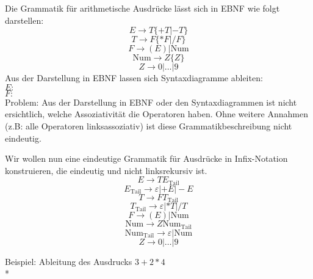 \documentclass[a4paper]{scrartcl}
\begin{document}
Die Grammatik für arithmetische Ausdrücke lässt sich in EBNF wie folgt darstellen:
\[E \rightarrow T \{ + T | -T\}\]
\[T \rightarrow F \{*F |  /F\} \]
\[F \rightarrow (E) | \text{Num} \]
\[\text{Num} \rightarrow Z \{Z\} \]
\[Z \rightarrow 0| \dots |9\]
Aus der Darstellung in EBNF lassen sich Syntaxdiagramme ableiten:\\
$E:$\\ %
$F:$\\

Problem: Aus der Darstellung in EBNF oder den Syntaxdiagrammen ist nicht ersichtlich, welche Assoziativität die Operatoren haben. Ohne weitere Annahmen (z.B: alle Operatoren linksassoziativ) ist diese Grammatikbeschreibung nicht eindeutig.

Wir wollen nun eine eindeutige Grammatik für Ausdrücke in Infix-Notation konstruieren, die eindeutig und nicht linksrekursiv ist.
\[E \rightarrow T E_{\text{Tail}}\]
\[E_{\text{Tail}} \rightarrow \varepsilon  | +E | -E\]
\[T \rightarrow F T_{\text{Tail}} \]
\[T_{\text{Tail}} \rightarrow \varepsilon | * T | /T\]
\[F \rightarrow (E) | \text{Num} \]
\[\text{Num} \rightarrow Z \text{Num}_{\text{Tail}} \]
\[\text{Num}_{\text{Tail}} \rightarrow \varepsilon | \text{Num} \]
\[Z \rightarrow 0 | \dots | 9 \]

Beispiel: Ableitung des Ausdrucks $3+2*4$\\*
\end{document}

